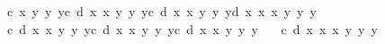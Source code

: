 \begin{isabellebody}
\ \ \ {\isacharminus}c{\isacharcircum}{}{\isacharasterisk}\ x{}{\isacharasterisk}\ y{}{\isacharcircum}{}\ {\isacharasterisk}y{}{\isacharasterisk}\ y{}{\isacharcircum}{}{\isacharplus}c{\isacharasterisk}\ d\ {\isacharasterisk}x{}{\isacharcircum}{}{\isacharasterisk}\ x{}{\isacharcircum}{}{\isacharasterisk}\ y{}{\isacharcircum}{}{\isacharasterisk}\ y{}{\isacharasterisk}\ y{}{\isacharcircum}{}{\isacharminus}c{\isacharasterisk}\ d{\isacharasterisk}\ x{}{\isacharasterisk}\ x{}{\isacharcircum}{}{\isacharasterisk}\ y{}{\isacharasterisk}\ y{}{\isacharcircum}{}{\isacharasterisk}\ y{}{\isacharcircum}{}{\isacharplus}d{\isacharcircum}{}{\isacharasterisk}\ x{}{\isacharcircum}{}{\isacharasterisk}\ x{}{\isacharcircum}{}{\isacharasterisk}\ x{}{\isacharcircum}{}{\isacharasterisk}\ y{}{\isacharasterisk}\ y{}{\isacharcircum}{}{\isacharasterisk}\ y{}{\isacharcircum}{}\isanewline
\ \ \ {\isacharminus}c{\isacharcircum}{}{\isacharasterisk}\ d{\isacharasterisk}\ x{}{\isacharcircum}{}{\isacharasterisk}\ x{}{\isacharasterisk}\ y{}{\isacharcircum}{}{\isacharasterisk}\ y{}{\isacharcircum}{}{\isacharasterisk}\ y{}{\isacharcircum}{}{\isacharplus}c{\isacharcircum}{}{\isacharasterisk}\ d{\isacharasterisk}\ x{}{\isacharasterisk}\ x{}{\isacharcircum}{}{\isacharasterisk}\ y{}{\isacharcircum}{}{\isacharasterisk}\ y{}{\isacharcircum}{}{\isacharasterisk}\ y{}{\isacharcircum}{}{\isacharplus}c{\isacharcircum}{}{\isacharasterisk}\ d{\isacharasterisk}\ x{}{\isacharasterisk}\ x{}{\isacharcircum}{}{\isacharasterisk}\ y{}{\isacharcircum}{}{\isacharasterisk}\ y{}{\isacharcircum}{}{\isacharasterisk}\ y{}{\isacharcircum}{}\isanewline
\ \ \ {\isacharminus}c{\isacharasterisk}\ d{\isacharcircum}{}{\isacharasterisk}\ x{}{\isacharasterisk}\ x{}{\isacharcircum}{}{\isacharasterisk}\ x{}{\isacharcircum}{}{\isacharasterisk}\ y{}{\isacharcircum}{}{\isacharasterisk}\ y{}{\isacharcircum}{}{\isacharasterisk}\ y{}{\isacharcircum}{}{\isacharparenright}{\isachardoublequoteclose}\isanewline

\end{isabellebody}
